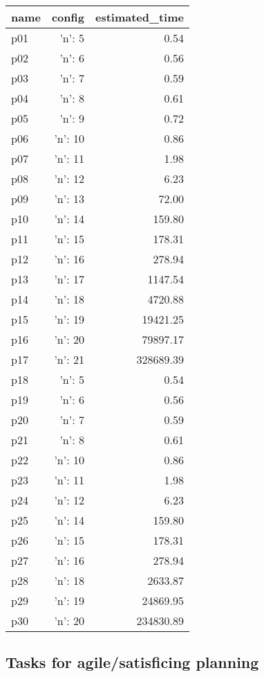 \documentclass{article}
\begin{document}
                            \begin{center}
                            \scriptsize
                            \begin{tabular}{@{}l|r|r@{}}
                            name & config & estimated\_time\\\midrule
                              p01&{'n': 5}&0.54\\
  p02&{'n': 6}&0.56\\
  p03&{'n': 7}&0.59\\
  p04&{'n': 8}&0.61\\
  p05&{'n': 9}&0.72\\
  p06&{'n': 10}&0.86\\
  p07&{'n': 11}&1.98\\
  p08&{'n': 12}&6.23\\
  p09&{'n': 13}&72.00\\
  p10&{'n': 14}&159.80\\
  p11&{'n': 15}&178.31\\
  p12&{'n': 16}&278.94\\
  p13&{'n': 17}&1147.54\\
  p14&{'n': 18}&4720.88\\
  p15&{'n': 19}&19421.25\\
  p16&{'n': 20}&79897.17\\
  p17&{'n': 21}&328689.39\\
  p18&{'n': 5}&0.54\\
  p19&{'n': 6}&0.56\\
  p20&{'n': 7}&0.59\\
  p21&{'n': 8}&0.61\\
  p22&{'n': 10}&0.86\\
  p23&{'n': 11}&1.98\\
  p24&{'n': 12}&6.23\\
  p25&{'n': 14}&159.80\\
  p26&{'n': 15}&178.31\\
  p27&{'n': 16}&278.94\\
  p28&{'n': 18}&2633.87\\
  p29&{'n': 19}&24869.95\\
  p30&{'n': 20}&234830.89
                            \end{tabular}
                            \end{center}
                    

                                \subsection*{Tasks for agile/satisficing planning}
                                
\end{document}
